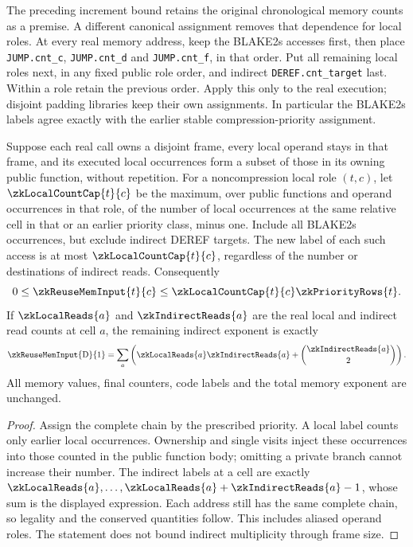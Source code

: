 The preceding increment bound retains the original chronological memory counts as a premise. A different canonical assignment removes that dependence for local roles. At every real memory address, keep the BLAKE2s accesses first, then place \texttt{JUMP.cnt\_c}, \texttt{JUMP.cnt\_d} and \texttt{JUMP.cnt\_f}, in that order. Put all remaining local roles next, in any fixed public role order, and indirect \texttt{DEREF.cnt\_target} last. Within a role retain the previous order. Apply this only to the real execution; disjoint padding libraries keep their own assignments. In particular the BLAKE2s labels agree exactly with the earlier stable compression-priority assignment.

\begin{lemma}\label{lem:zk-local-role-priority}
Suppose each real call owns a disjoint frame, every local operand stays in that frame, and its executed local occurrences form a subset of those in its owning public function, without repetition. For a noncompression local role $(t,c)$, let $\zkLocalCountCap{t}{c}$ be the maximum, over public functions and operand occurrences in that role, of the number of local occurrences at the same relative cell in that or an earlier priority class, minus one. Include all BLAKE2s occurrences, but exclude indirect DEREF targets. The new label of each such access is at most $\zkLocalCountCap{t}{c}$, regardless of the number or destinations of indirect reads. Consequently
\[
 0\le\zkReuseMemInput{t}{c}
 \le\zkLocalCountCap{t}{c}\zkPriorityRows{t}.
\]
If $\zkLocalReads{a}$ and $\zkIndirectReads{a}$ are the real local and indirect read counts at cell $a$, the remaining indirect exponent is exactly
\[
 \zkReuseMemInput{\mathrm D}{1}
 =\sum_a\left(\zkLocalReads{a}\zkIndirectReads{a}
                    +\binom{\zkIndirectReads{a}}2\right).
\]
All memory values, final counters, code labels and the total memory exponent are unchanged.
\end{lemma}
\begin{proof}
Assign the complete chain by the prescribed priority. A local label counts only earlier local occurrences. Ownership and single visits inject these occurrences into those counted in the public function body; omitting a private branch cannot increase their number. The indirect labels at a cell are exactly $\zkLocalReads{a},\ldots,\zkLocalReads{a}+\zkIndirectReads{a}-1$, whose sum is the displayed expression. Each address still has the same complete chain, so legality and the conserved quantities follow. This includes aliased operand roles. The statement does not bound indirect multiplicity through frame size.
\end{proof}

